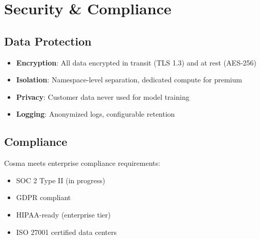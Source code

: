 \section{Security \& Compliance}

\subsection{Data Protection}

\begin{itemize}[noitemsep]
    \item \textbf{Encryption}: All data encrypted in transit (TLS 1.3) and at rest (AES-256)
    \item \textbf{Isolation}: Namespace-level separation, dedicated compute for premium
    \item \textbf{Privacy}: Customer data never used for model training
    \item \textbf{Logging}: Anonymized logs, configurable retention
\end{itemize}

\subsection{Compliance}

Cosma meets enterprise compliance requirements:

\begin{itemize}[noitemsep]
    \item SOC 2 Type II (in progress)
    \item GDPR compliant
    \item HIPAA-ready (enterprise tier)
    \item ISO 27001 certified data centers
\end{itemize}
